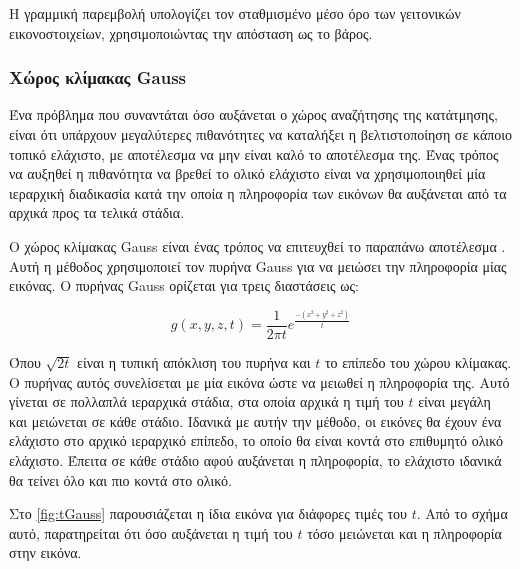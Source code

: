 \documentclass[a4paper,12pt]{article}
\begin{document}
Η γραμμική παρεμβολή υπολογίζει τον σταθμισμένο μέσο όρο των γειτονικών
εικονοστοιχείων, χρησιμοποιώντας την απόσταση ως το βάρος.

\subsubsection{Χώρος κλίμακας Gauss} \label{reg:gauss:1}

Ένα πρόβλημα που συναντάται όσο αυξάνεται ο χώρος αναζήτησης της κατάτμησης,
είναι ότι υπάρχουν μεγαλύτερες πιθανότητες να καταλήξει η βελτιστοποίηση σε
κάποιο τοπικό ελάχιστο, με αποτέλεσμα να μην είναι καλό το αποτέλεσμα της. Ένας
τρόπος να αυξηθεί η πιθανότητα να βρεθεί το ολικό ελάχιστο είναι να
χρησιμοποιηθεί μία ιεραρχική διαδικασία κατά την οποία η πληροφορία των εικόνων
θα αυξάνεται από τα αρχικά προς τα τελικά στάδια. 

Ο χώρος κλίμακας Gauss είναι ένας τρόπος να επιτευχθεί το παραπάνω αποτέλεσμα
\cite{scale_space:1}. Αυτή η μέθοδος χρησιμοποιεί τον πυρήνα Gauss για να
μειώσει την πληροφορία μίας εικόνας. Ο πυρήνας Gauss ορίζεται για τρεις
διαστάσεις ως:

\begin{equation} \label{gaussian_kernel:1}
    g(x,y,z,t) = \frac{1} {2 \pi t} e^{\frac{-(x^2 + y^2 + z^2) }{t}}
\end{equation}

Όπου $\sqrt{2t}$ είναι η τυπική απόκλιση του πυρήνα και $t$ το επίπεδο του χώρου
κλίμακας. Ο πυρήνας αυτός συνελίσεται με μία εικόνα ώστε να μειωθεί η πληροφορία
της. Αυτό γίνεται σε πολλαπλά ιεραρχικά στάδια, στα οποία αρχικά η τιμή του $t$
είναι μεγάλη και μειώνεται σε κάθε στάδιο. Ιδανικά με αυτήν την μέθοδο, οι
εικόνες θα έχουν ένα ελάχιστο στο αρχικό ιεραρχικό επίπεδο, το οποίο θα είναι
κοντά στο επιθυμητό ολικό ελάχιστο. Έπειτα σε κάθε στάδιο αφού αυξάνεται η
πληροφορία, το ελάχιστο ιδανικά θα τείνει όλο και πιο κοντά στο ολικό.

Στο \autoref{fig:tGauss} παρουσιάζεται η ίδια εικόνα για διάφορες τιμές του $t$.
Από το σχήμα αυτό, παρατηρείται ότι όσο αυξάνεται η τιμή του $t$ τόσο μειώνεται
και η πληροφορία στην εικόνα.
\end{document}
